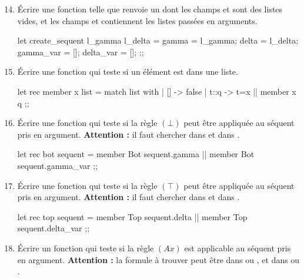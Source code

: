 \documentclass[a4paper,french,bookmarks]{article}
\begin{document}
    \begin{enumerate}
        \setcounter{enumi}{13}
        \item  Écrire une fonction  telle que  renvoie un  dont les champs  et  sont des listes vides, et les champs  et  contiennent les listes passées en arguments.
        
        \begin{ocaml}
let create_sequent l_gamma l_delta = { 
	gamma = l_gamma;
	delta = l_delta;
	gamma_var = [];
	delta_var = [];
}
;;
        \end{ocaml}
        
        \item Écrire une fonction  qui teste si un élément est dans une liste.
        
        \begin{ocaml}
let rec member x list = match list with 
	| [] -> false
	| t::q -> t=x || member x q 
;;
        \end{ocaml}
        
        \item Écrire une fonction  qui teste si la règle $(\bot)$ peut être appliquée au séquent pris en argument. \textbf{\sffamily Attention :} il faut chercher dans  et dans .
        
        \begin{ocaml}
let rec bot sequent =
    member Bot sequent.gamma || member Bot sequent.gamma_var
;;
        \end{ocaml}
        
        \item Écrire une fonction  qui teste si la règle $(\top)$ peut être appliquée au séquent pris en argument. \textbf{\sffamily Attention :} il faut chercher dans  et dans .

        \begin{ocaml}
let rec top sequent =
    member Top sequent.delta || member Top sequent.delta_var
;; 
        \end{ocaml}
        
        \item Écrire un fonction  qui teste si la règle $(Ax)$ est applicable au séquent pris en argument.
        \textbf{\sffamily Attention :} la formule à trouver peut être dans  ou , et dans  ou .
        

\end{enumerate}
\end{document}
